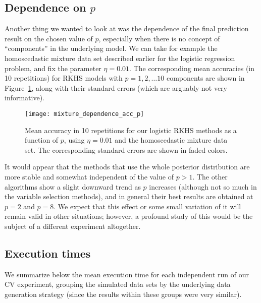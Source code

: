 \subsection*{Dependence on \(p\)}

Another thing we wanted to look at was the dependence of the final prediction result on the chosen value of \(p\), especially when there is no concept of ``components'' in the underlying model. We can take for example the homoscedastic mixture data set described earlier for the logistic regression problem, and fix the parameter \(\eta=0.01\). The corresponding mean accuracies (in 10 repetitions) for RKHS models with \(p=1,2,\dots 10\) components are shown in Figure~\ref{fig:dependence_acc_p}, along with their standard errors (which are arguably not very informative).

\begin{figure}[ht!]
  \centering
  \texttt{[image: mixture\_dependence\_acc\_p]}
  \caption{Mean accuracy in 10 repetitions for our logistic RKHS methods as a function of \(p\), using \(\eta=0.01\) and the homoscedastic mixture data set. The corresponding standard errors are shown in faded colors.}\label{fig:dependence_acc_p}
\end{figure}

It would appear that the methods that use the whole posterior distribution are more stable and somewhat independent of the value of \(p>1\). The other algorithms show a slight downward trend as \(p\) increases (although not so much in the variable selection methods), and in general their best results are obtained at \(p=2\) and \(p=8\). We expect that this effect or some small variation of it will remain valid in other situations; however, a profound study of this would be the subject of a different experiment altogether.

\subsection*{Execution times}

We summarize below the mean execution time for each independent run of our CV experiment, grouping the simulated data sets by the underlying data generation strategy (since the results within these groups were very similar).

